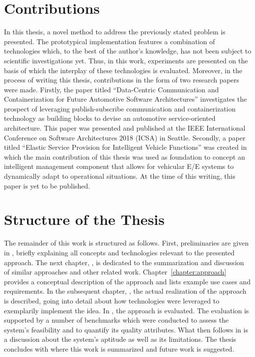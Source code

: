 \section{Contributions}
In this thesis, a novel method to address the previously stated problem is presented. The prototypical implementation features a combination of technologies which, to the best of the author's knowledge, has not been subject to scientific investigations yet. Thus, in this work, experiments are presented on the basis of which the interplay of these technologies is evaluated.
Moreover, in the process of writing this thesis, contributions in the form of two research papers were made.
Firstly, the paper titled ``Data-Centric Communication and Containerization for Future Automotive Software Architectures'' \cite{kugele:hettler:peter:icsa18} investigates the prospect of leveraging publish-subscribe communication and containerization technology as building blocks to devise an automotive service-oriented architecture. This paper was presented and published at the IEEE International Conference on Software Architectures 2018 (ICSA) in Seattle.
Secondly, a paper titled ``Elastic Service Provision for Intelligent Vehicle Functions'' \cite{kugele:hettler:itsc} was created in which the main contribution of this thesis was used as foundation to concept an intelligent management component that allows for vehicular E/E systems to dynamically adapt to operational situations. At the time of this writing, this paper is yet to be published.
%
%
%
%
%
%
%
%
%
%
\section{Structure of the Thesis}
The remainder of this work is structured as follows. First, preliminaries are given in , briefly explaining all concepts and technologies relevant to the presented approach. The next chapter, , is dedicated to the summarization and discussion of similar approaches and other related work. Chapter~\ref{chapter:approach} provides a conceptual description of the approach and lists example use cases and requirements. In the subsequent chapter, , the actual realization of the approach is described, going into detail about how technologies were leveraged to exemplarily implement the idea. In , the approach is evaluated. The evaluation is supported by a number of benchmarks which were conducted to assess the system's feasibility and to quantify its quality attributes. What then follows in  is a discussion about the system's aptitude as well as its limitations. The thesis concludes with  where this work is summarized and future work is suggested.

%
%
%
%
%
%
%
%
%
%
%
%
%
%
%
%
%
%
%
%
%
%
%
%
%
%
%
%
%
%
%
%
%
%
%
%
%
%
